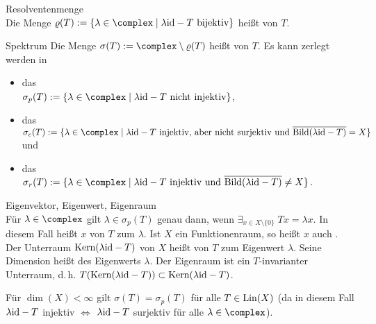 \begin{Def}{Resolventenmenge}\\
    Die Menge $\varrho(T) := \{\lambda \in \complex \;|\; \lambda\id - T \text{ bijektiv}\}$
    heißt  von $T$.
\end{Def}

\begin{Def}{Spektrum}
    Die Menge $\sigma(T) := \complex \setminus \varrho(T)$
    heißt  von $T$.
    Es kann zerlegt werden in
    \begin{itemize}
        \item
        das \\
        $\sigma_p(T) := \{\lambda \in \complex \;|\; \lambda\id - T \text{ nicht injektiv}\}$,

        \item
        das \\
        $\sigma_c(T) := \{\lambda \in \complex \;|\; \lambda\id - T
        \text{ injektiv, aber nicht surjektiv und } \overline{\Bild(\lambda\id - T)} = X\}$ und

        \item
        das \\
        $\sigma_r(T) := \{\lambda \in \complex \;|\; \lambda\id - T
        \text{ injektiv und } \overline{\Bild(\lambda\id - T)} \not= X\}$.
    \end{itemize}
\end{Def}

\begin{Def}{Eigenvektor, Eigenwert, Eigenraum}\\
    Für $\lambda \in \complex$ gilt $\lambda \in \sigma_p(T)$ genau dann, wenn
    $\exists_{x \in X \setminus \{0\}}\; Tx = \lambda x$.
    In diesem Fall heißt $x$  von $T$ zum  $\lambda$.
    Ist $X$ ein Funktionenraum, so heißt $x$ auch .
    Der Unterraum $\text{Kern}(\lambda\text{id} - T)$ von $X$ heißt  von $T$ zum
    Eigenwert $\lambda$.
    Seine Dimension heißt  des Eigenwerts $\lambda$.
    Der Eigenraum ist ein $T$-invarianter Unterraum, d.\,h.
    $T(\text{Kern}(\lambda\text{id} - T)) \subset \text{Kern}(\lambda\text{id} - T)$.
\end{Def}

\begin{Bem}
    Für $\dim(X) < \infty$ gilt $\sigma(T) = \sigma_p(T)$ für alle $T \in \operatorname{Lin}(X)$
    (da in diesem Fall $\lambda\text{id} - T$ injektiv $\iff$ $\lambda\text{id} - T$ surjektiv für alle
    $\lambda \in \complex$).
\end{Bem}

